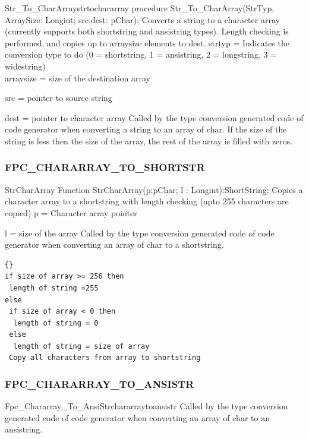 \documentclass [a4paper,12pt]{article}
\begin{document}
\begin{procedurel}{Str{\_}To{\_}CharArray}{strtochararray}
\Declaration
procedure Str{\_}To{\_}CharArray(StrTyp, ArraySize: Longint; src,dest: pChar);
\Description
Converts a string to a character array (currently supports both shortstring and ansistring types). Length checking is performed, and copies up to \textsf{arraysize} elements to dest.
\Parameters
strtyp = Indicates the conversion type to do (0 = shortstring, 1 =
ansistring, 2 = longstring, 3 = widestring) \\
arraysize = size of the destination array \par
src = pointer to source string \par
dest = pointer to character array
\Notes
Called by the type conversion generated code of code generator when
converting a string to an array of char. If the size of the string is less
then the size of the array, the rest of the array is filled with zeros.
\end{procedurel}

\subsubsection{FPC{\_}CHARARRAY{\_}TO{\_}SHORTSTR}
\label{subsubsec:mylabel47}

\begin{function}{StrCharArray}
\Declaration
Function StrCharArray(p:pChar; l : Longint):ShortString;
\Description
Copies a character array to a shortstring with length checking (upto 255
characters are copied)
\Parameters
p = Character array pointer \par
l = size of the array
\Notes
Called by the type conversion generated code of code generator when
converting an array of char to a shortstring.
\Algorithm
\begin{lstlisting}{}
if size of array >= 256 then 
 length of string =255
else
 if size of array < 0 then
  length of string = 0
 else
  length of string = size of array
 Copy all characters from array to shortstring
\end{lstlisting}
\end{function}

\subsubsection{FPC{\_}CHARARRAY{\_}TO{\_}ANSISTR}
\label{subsubsec:mylabel48}

\begin{functionl}{Fpc{\_}Chararray{\_}To{\_}AnsiStr}{chararraytoansistr}
\Notes
Called by the type conversion generated code of code generator when converting an array of char to an ansistring.
\end{functionl}
\end{document}
